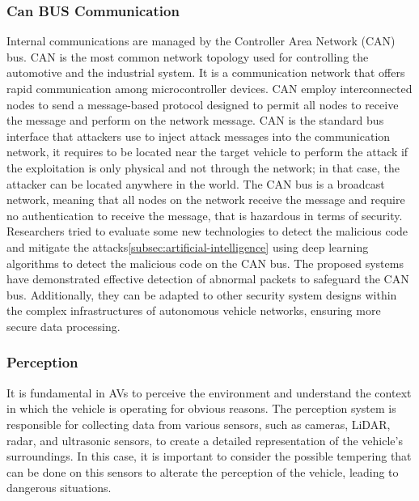 \subsubsection{Can BUS Communication}\label{subsubsec:canbus-communication}
Internal communications are managed by the Controller Area Network (CAN) bus.
CAN is the most common network topology used for controlling the automotive and the industrial system.
It is a communication network that offers rapid communication among microcontroller
devices.
CAN employ interconnected nodes to send a message-based protocol designed to
permit all nodes to receive the message and perform on the network message\cite{canbus}.
CAN is the standard bus interface that attackers use to inject attack messages into the
communication network, it requires to be located near the target vehicle to perform the attack if the exploitation is only physical and not through the network; in that case, the attacker can be located anywhere in the world.
The CAN bus is a broadcast network, meaning that all nodes on the network receive the message and require no authentication to receive the message, that is hazardous in terms of security.
Researchers tried to evaluate some new technologies to detect the malicious code and mitigate the attacks\cite{aldhyani2022attacks}\ref{subsec:artificial-intelligence} using deep learning algorithms to detect the malicious code on the CAN bus.
The proposed systems have demonstrated effective detection of abnormal packets to safeguard the CAN bus.
Additionally, they can be adapted to other security system designs within the complex infrastructures of autonomous vehicle networks, ensuring more secure data processing.

\subsubsection{Perception}\label{subsubsec:perception}
It is fundamental in AVs to perceive the environment and understand the context in which the vehicle is operating for obvious reasons.
The perception system is responsible for collecting data from various sensors, such as cameras, LiDAR, radar, and ultrasonic sensors, to create a detailed representation of the vehicle's surroundings.
In this case, it is important to consider the possible tempering that can be done on this sensors to alterate the perception of the vehicle, leading to dangerous situations\cite{kim2020cybersecurity, sec-sensors-2023, metro2020analysis, attacks-2020}.

